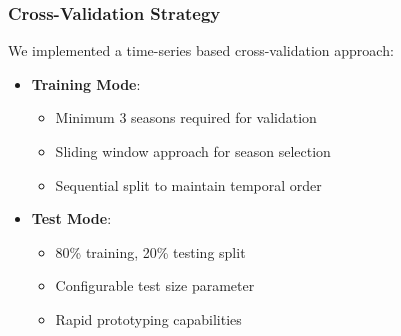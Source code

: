 \documentclass[conference]{IEEEtran}
\begin{document}
\subsubsection{Cross-Validation Strategy}
We implemented a time-series based cross-validation approach:
\begin{itemize}
\item \textbf{Training Mode}:
    \begin{itemize}
    \item Minimum 3 seasons required for validation
    \item Sliding window approach for season selection
    \item Sequential split to maintain temporal order
    \end{itemize}
\item \textbf{Test Mode}:
    \begin{itemize}
    \item 80\% training, 20\% testing split
    \item Configurable test size parameter
    \item Rapid prototyping capabilities
    \end{itemize}
\end{itemize}
\end{document}
